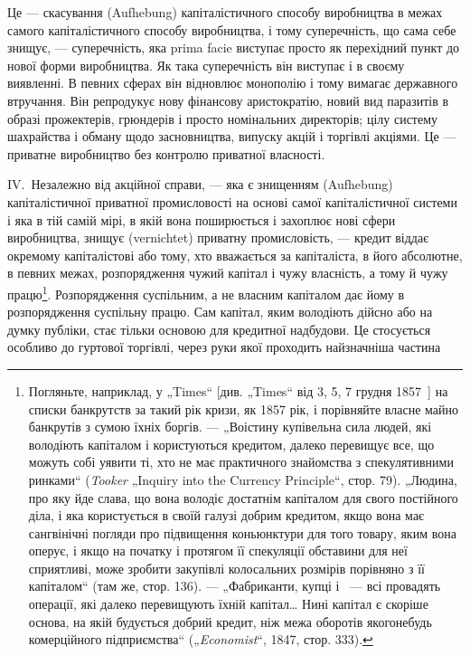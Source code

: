 Це — скасування (Aufhebung) капіталістичного способу виробництва
в межах самого капіталістичного способу виробництва,
і тому суперечність, що сама себе знищує, — суперечність, яка
prima facie виступає просто як перехідний пункт до нової
форми виробництва. Як така суперечність він виступає і в
своєму виявленні. В певних сферах він відновлює монополію і
тому вимагає державного втручання. Він репродукує нову фінансову аристократію, новий вид паразитів в
образі прожектерів,
грюндерів і просто номінальних директорів; цілу систему шахрайства і обману щодо засновництва,
випуску акцій і торгівлі акціями.
Це — приватне виробництво без контролю приватної власності.

IV.~Незалежно від акційної справи, — яка є знищенням (Aufhebung) капіталістичної приватної
промисловості на основі самої
капіталістичної системи і яка в тій самій мірі, в якій вона поширюється і захоплює нові сфери
виробництва, знищує (vernichtet)
приватну промисловість, — кредит віддає окремому капіталістові
або тому, хто вважається за капіталіста, в його абсолютне, в
певних межах, розпорядження чужий капітал і чужу власність,
а тому й чужу працю\footnote{
Погляньте, наприклад, у „Times“ [див. „Times“ від 3, 5, 7 грудня 1857~]
на списки банкрутств за такий рік кризи, як 1857 рік, і порівняйте власне майно
банкрутів з сумою їхніх боргів. — „Воістину купівельна сила людей, які володіють
капіталом і користуються кредитом, далеко перевищує все, що можуть собі уявити
ті, хто не має практичного знайомства з спекулятивними ринками“ (\emph{Tooker}
„Inquiry into the Currency Principle“, стор. 79). „Людина, про яку йде слава, що
вона володіє достатнім капіталом для свого постійного діла, і яка користується в своїй галузі добрим
кредитом, якщо вона має сангвінічні погляди
про підвищення коньюнктури для того товару, яким вона оперує, і якщо на
початку і протягом її спекуляції обставини для неї сприятливі, може зробити
закупівлі колосальних розмірів порівняно з її капіталом“ (там же, стор. 136). —
 „Фабриканти, купці і~ — всі провадять операції, які далеко перевищують їхній
капітал\dots{} Нині капітал є скоріше основа, на якій будується добрий кредит,
ніж межа оборотів якогонебудь комерційного підприємства“ („\emph{Economist}“, 1847,
стор. 333).
}. Розпорядження суспільним, а не власним
капіталом дає йому в розпорядження суспільну працю. Сам капітал, яким володіють дійсно або на думку
публіки, стає тільки
основою для кредитної надбудови. Це стосується особливо до
гуртової торгівлі, через руки якої проходить найзначніша частина

